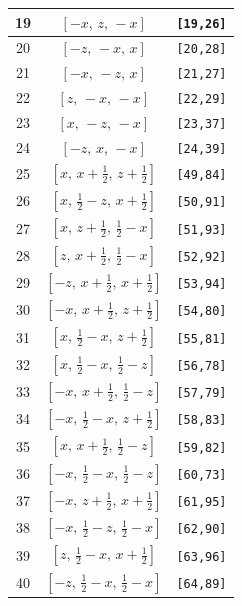 \documentclass[fleqn,8pt]{jsarticle}
\begin{document}
\begin{longtable}{ccc}
19 & $\left[ - x,\, z,\, - x \right]$ & {\tt [19,26]} \\ \hline
20 & $\left[ - z,\, - x,\, x \right]$ & {\tt [20,28]} \\ \hline
21 & $\left[ - x,\, - z,\, x \right]$ & {\tt [21,27]} \\ \hline
22 & $\left[ z,\, - x,\, - x \right]$ & {\tt [22,29]} \\ \hline
23 & $\left[ x,\, - z,\, - x \right]$ & {\tt [23,37]} \\ \hline
24 & $\left[ - z,\, x,\, - x \right]$ & {\tt [24,39]} \\ \hline
25 & $\left[ x,\, x + \frac{1}{2},\, z + \frac{1}{2} \right]$ & {\tt [49,84]} \\ \hline
26 & $\left[ x,\, \frac{1}{2} - z,\, x + \frac{1}{2} \right]$ & {\tt [50,91]} \\ \hline
27 & $\left[ x,\, z + \frac{1}{2},\, \frac{1}{2} - x \right]$ & {\tt [51,93]} \\ \hline
28 & $\left[ z,\, x + \frac{1}{2},\, \frac{1}{2} - x \right]$ & {\tt [52,92]} \\ \hline
29 & $\left[ - z,\, x + \frac{1}{2},\, x + \frac{1}{2} \right]$ & {\tt [53,94]} \\ \hline
30 & $\left[ - x,\, x + \frac{1}{2},\, z + \frac{1}{2} \right]$ & {\tt [54,80]} \\ \hline
31 & $\left[ x,\, \frac{1}{2} - x,\, z + \frac{1}{2} \right]$ & {\tt [55,81]} \\ \hline
32 & $\left[ x,\, \frac{1}{2} - x,\, \frac{1}{2} - z \right]$ & {\tt [56,78]} \\ \hline
33 & $\left[ - x,\, x + \frac{1}{2},\, \frac{1}{2} - z \right]$ & {\tt [57,79]} \\ \hline
34 & $\left[ - x,\, \frac{1}{2} - x,\, z + \frac{1}{2} \right]$ & {\tt [58,83]} \\ \hline
35 & $\left[ x,\, x + \frac{1}{2},\, \frac{1}{2} - z \right]$ & {\tt [59,82]} \\ \hline
36 & $\left[ - x,\, \frac{1}{2} - x,\, \frac{1}{2} - z \right]$ & {\tt [60,73]} \\ \hline
37 & $\left[ - x,\, z + \frac{1}{2},\, x + \frac{1}{2} \right]$ & {\tt [61,95]} \\ \hline
38 & $\left[ - x,\, \frac{1}{2} - z,\, \frac{1}{2} - x \right]$ & {\tt [62,90]} \\ \hline
39 & $\left[ z,\, \frac{1}{2} - x,\, x + \frac{1}{2} \right]$ & {\tt [63,96]} \\ \hline
40 & $\left[ - z,\, \frac{1}{2} - x,\, \frac{1}{2} - x \right]$ & {\tt [64,89]} \\ \hline

\end{longtable}
\end{document}
